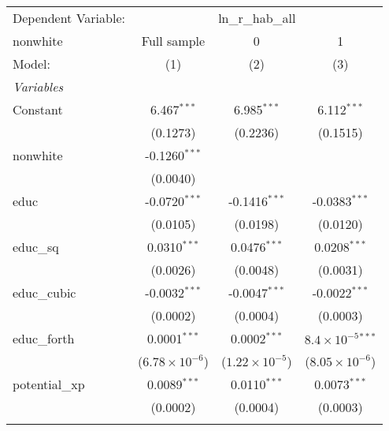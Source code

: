 
\begingroup
\centering
\begin{tabular}{lccc}
   \tabularnewline \midrule \midrule
   Dependent Variable: & \multicolumn{3}{c}{ln\_r\_hab\_all}\\
   nonwhite                        & Full sample             & 0                       & 1 \\   
   Model:                          & (1)                     & (2)                     & (3)\\  
   \midrule
   \emph{Variables}\\
   Constant                        & 6.467$^{***}$           & 6.985$^{***}$           & 6.112$^{***}$\\   
                                   & (0.1273)                & (0.2236)                & (0.1515)\\   
   nonwhite                        & -0.1260$^{***}$         &                         &   \\   
                                   & (0.0040)                &                         &   \\   
   educ                            & -0.0720$^{***}$         & -0.1416$^{***}$         & -0.0383$^{***}$\\   
                                   & (0.0105)                & (0.0198)                & (0.0120)\\   
   educ\_sq                        & 0.0310$^{***}$          & 0.0476$^{***}$          & 0.0208$^{***}$\\   
                                   & (0.0026)                & (0.0048)                & (0.0031)\\   
   educ\_cubic                     & -0.0032$^{***}$         & -0.0047$^{***}$         & -0.0022$^{***}$\\   
                                   & (0.0002)                & (0.0004)                & (0.0003)\\   
   educ\_forth                     & 0.0001$^{***}$          & 0.0002$^{***}$          & $8.4\times 10^{-5}$$^{***}$\\    
                                   & ($6.78\times 10^{-6}$)  & ($1.22\times 10^{-5}$)  & ($8.05\times 10^{-6}$)\\    
   potential\_xp                   & 0.0089$^{***}$          & 0.0110$^{***}$          & 0.0073$^{***}$\\   
                                   & (0.0002)                & (0.0004)                & (0.0003)\\   
$$
\end{tabular}
